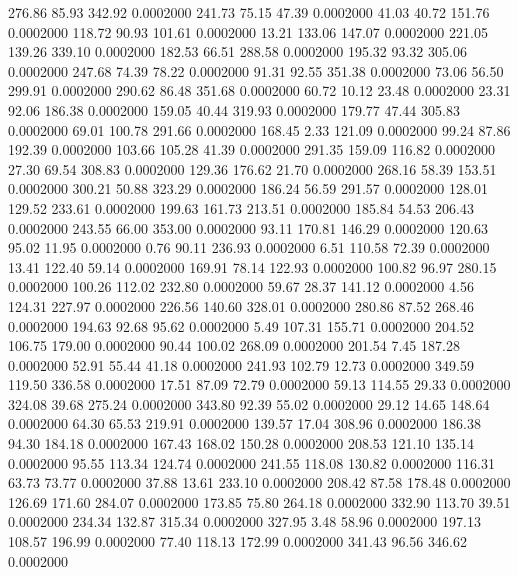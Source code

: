  276.86   85.93  342.92   0.0002000
 241.73   75.15   47.39   0.0002000
  41.03   40.72  151.76   0.0002000
 118.72   90.93  101.61   0.0002000
  13.21  133.06  147.07   0.0002000
 221.05  139.26  339.10   0.0002000
 182.53   66.51  288.58   0.0002000
 195.32   93.32  305.06   0.0002000
 247.68   74.39   78.22   0.0002000
  91.31   92.55  351.38   0.0002000
  73.06   56.50  299.91   0.0002000
 290.62   86.48  351.68   0.0002000
  60.72   10.12   23.48   0.0002000
  23.31   92.06  186.38   0.0002000
 159.05   40.44  319.93   0.0002000
 179.77   47.44  305.83   0.0002000
  69.01  100.78  291.66   0.0002000
 168.45    2.33  121.09   0.0002000
  99.24   87.86  192.39   0.0002000
 103.66  105.28   41.39   0.0002000
 291.35  159.09  116.82   0.0002000
  27.30   69.54  308.83   0.0002000
 129.36  176.62   21.70   0.0002000
 268.16   58.39  153.51   0.0002000
 300.21   50.88  323.29   0.0002000
 186.24   56.59  291.57   0.0002000
 128.01  129.52  233.61   0.0002000
 199.63  161.73  213.51   0.0002000
 185.84   54.53  206.43   0.0002000
 243.55   66.00  353.00   0.0002000
  93.11  170.81  146.29   0.0002000
 120.63   95.02   11.95   0.0002000
   0.76   90.11  236.93   0.0002000
   6.51  110.58   72.39   0.0002000
  13.41  122.40   59.14   0.0002000
 169.91   78.14  122.93   0.0002000
 100.82   96.97  280.15   0.0002000
 100.26  112.02  232.80   0.0002000
  59.67   28.37  141.12   0.0002000
   4.56  124.31  227.97   0.0002000
 226.56  140.60  328.01   0.0002000
 280.86   87.52  268.46   0.0002000
 194.63   92.68   95.62   0.0002000
   5.49  107.31  155.71   0.0002000
 204.52  106.75  179.00   0.0002000
  90.44  100.02  268.09   0.0002000
 201.54    7.45  187.28   0.0002000
  52.91   55.44   41.18   0.0002000
 241.93  102.79   12.73   0.0002000
 349.59  119.50  336.58   0.0002000
  17.51   87.09   72.79   0.0002000
  59.13  114.55   29.33   0.0002000
 324.08   39.68  275.24   0.0002000
 343.80   92.39   55.02   0.0002000
  29.12   14.65  148.64   0.0002000
  64.30   65.53  219.91   0.0002000
 139.57   17.04  308.96   0.0002000
 186.38   94.30  184.18   0.0002000
 167.43  168.02  150.28   0.0002000
 208.53  121.10  135.14   0.0002000
  95.55  113.34  124.74   0.0002000
 241.55  118.08  130.82   0.0002000
 116.31   63.73   73.77   0.0002000
  37.88   13.61  233.10   0.0002000
 208.42   87.58  178.48   0.0002000
 126.69  171.60  284.07   0.0002000
 173.85   75.80  264.18   0.0002000
 332.90  113.70   39.51   0.0002000
 234.34  132.87  315.34   0.0002000
 327.95    3.48   58.96   0.0002000
 197.13  108.57  196.99   0.0002000
  77.40  118.13  172.99   0.0002000
 341.43   96.56  346.62   0.0002000
